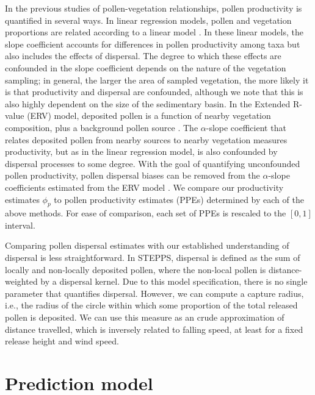 \documentclass[12pt]{article}
\begin{document}
In the previous studies of pollen-vegetation relationships, pollen
productivity is quantified in several ways. In linear regression
models, pollen and vegetation proportions are related according to a
linear model \citep{bradshaw1985relationships, jackson1990}. In these
linear models, the slope coefficient accounts for differences in
pollen productivity among taxa but also includes the effects of
dispersal. The degree to which these effects are confounded in the
slope coefficient depends on the nature of the vegetation sampling; in
general, the larger the area of sampled vegetation, the more likely it
is that productivity and dispersal are confounded, although we note
that this is also highly dependent on the size of the sedimentary
basin. In the Extended R-value (ERV) model, deposited pollen is a
function of nearby vegetation composition, plus a background pollen
source \citep{prentice1986, prentice1987quantitative,
  marquer2014holocene, brostrom2008pollen}. The $\alpha$-slope
coefficient that relates deposited pollen from nearby sources to
nearby vegetation measures productivity, but as in the linear
regression model, is also confounded by dispersal processes to some
degree. With the goal of quantifying unconfounded pollen productivity,
pollen dispersal biases can be removed from the $\alpha$-slope
coefficients estimated from the ERV model
\citep{sugita1999landscape}. We compare our productivity estimates
$\phi_p$ to pollen productivity estimates (PPEs) determined by each of
the above methods. For ease of comparison, each set of PPEs is
rescaled to the $[0,1]$ interval.

Comparing pollen dispersal estimates with our established
understanding of dispersal is less straightforward. In STEPPS,
dispersal is defined as the sum of locally and non-locally deposited
pollen, where the non-local pollen is distance-weighted by a dispersal
kernel. Due to this model specification, there is no single parameter
that quantifies dispersal. However, we can compute a capture radius,
i.e., the radius of the circle within which some proportion of the
total released pollen is deposited. We can use this measure as an
crude approximation of distance travelled, which is inversely related
to falling speed, at least for a fixed release height and
wind speed.

\section{Prediction model}
\label{sec:pred}
\end{document}
